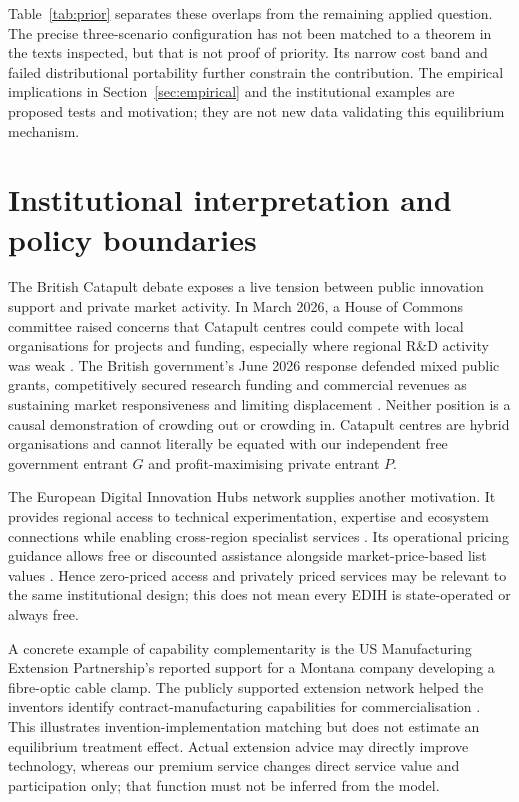 \documentclass[11pt]{article}
\begin{document}
Table~\ref{tab:prior} separates these overlaps from the remaining applied question.
The precise three-scenario configuration has not been matched to a theorem in the texts inspected, but that is not proof of priority.
Its narrow cost band and failed distributional portability further constrain the contribution.
The empirical implications in Section~\ref{sec:empirical} and the institutional examples are proposed tests and motivation; they are not new data validating this equilibrium mechanism.

\section{Institutional interpretation and policy boundaries}\label{sec:institutions}
The British Catapult debate exposes a live tension between public innovation support and private market activity. In March 2026, a House of Commons committee raised concerns that Catapult centres could compete with local organisations for projects and funding, especially where regional R\&D activity was weak \citep{UKCommittee2026}. The British government's June 2026 response defended mixed public grants, competitively secured research funding and commercial revenues as sustaining market responsiveness and limiting displacement \citep{UKGovernment2026}. Neither position is a causal demonstration of crowding out or crowding in. Catapult centres are hybrid organisations and cannot literally be equated with our independent free government entrant $G$ and profit-maximising private entrant $P$.

The European Digital Innovation Hubs network supplies another motivation. It provides regional access to technical experimentation, expertise and ecosystem connections while enabling cross-region specialist services \citep{EuropeanCommissionEDIH}. Its operational pricing guidance allows free or discounted assistance alongside market-price-based list values \citep{EDIHFAQ2026}. Hence zero-priced access and privately priced services may be relevant to the same institutional design; this does not mean every EDIH is state-operated or always free.

A concrete example of capability complementarity is the US Manufacturing Extension Partnership's reported support for a Montana company developing a fibre-optic cable clamp. The publicly supported extension network helped the inventors identify contract-manufacturing capabilities for commercialisation \citep{NISTFiberReaper2024}. This illustrates invention-implementation matching but does not estimate an equilibrium treatment effect.
Actual extension advice may directly improve technology, whereas our premium service changes direct service value and participation only; that function must not be inferred from the model.
\end{document}
